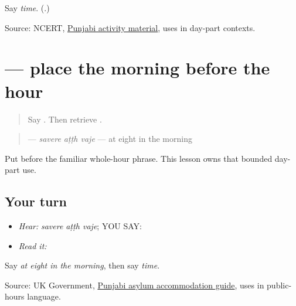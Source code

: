 \begin{tcolorbox}[breakable,colback=teal!4,colframe=teal!35!black,title={Before you move on}]
Say \emph{time}. (\textbf{}.)

Source: NCERT, \href{https://www.ncertbooks.net/textbook/pdf/bmnjm109.pdf}{Punjabi activity material}, uses \textbf{} in day-part contexts.
\end{tcolorbox}
\section[\texorpdfstring{\pa{ਸਵੇਰੇ} \pa{ਅੱਠ} \pa{ਵਜੇ} (savere atth vaje)}{ਸਵੇਰੇ ਅੱਠ ਵਜੇ (savere atth vaje)}]{   — place the morning before the hour}

\label{lesson:PA-C179-savere}



\begin{quote}
Say \textbf{}. Then retrieve \textbf{   }.
\end{quote}

\begin{grammarlens}[title={Grammar Lens: morning precedes the hour}]
\begin{quote}
\textbf{  } — \emph{savere aṭṭh vaje} — at eight in the morning
\end{quote}

Put \textbf{} before the familiar whole-hour phrase. This lesson owns that bounded day-part use.
\end{grammarlens}

\subsection*{Your turn}
\begin{itemize}
\raggedright
  \item \emph{Hear:} \emph{savere aṭṭh vaje}; YOU SAY: \textbf{  }
  \item \emph{Read it:} \textbf{  }
\end{itemize}

\begin{tcolorbox}[breakable,colback=teal!4,colframe=teal!35!black,title={Before you move on}]
Say \emph{at eight in the morning}, then say \emph{time}.

Source: UK Government, \href{https://assets.publishing.service.gov.uk/media/5d947f3340f0b65e64bf87ea/Pack\_B\_-\_Punjabi\_-\_Web.pdf}{Punjabi asylum accommodation guide}, uses \textbf{} in public-hours language.
\end{tcolorbox}
